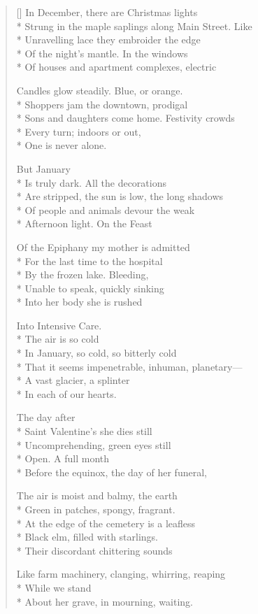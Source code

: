 \label{ch:christmaslight}
\settowidth{\versewidth}{Strung in the maple saplings along Main Street. Like}
\begin{verse}[\versewidth]
In December, there are Christmas lights\\*
Strung in the maple saplings along Main Street. Like\\*
Unravelling lace they embroider the edge\\*
Of the night's mantle. In the windows\\*
Of houses and apartment complexes, electric

Candles glow steadily. Blue, or orange.\\*
Shoppers jam the downtown, prodigal \\*
Sons and daughters come home. Festivity crowds\\*
Every turn; indoors or out,\\*
One is never alone.

\hspace*{4\vgap} But January \\*
Is truly dark. All the decorations\\*
Are stripped, the sun is low, the long shadows\\*
Of people and animals devour the weak\\*
Afternoon light. On the Feast

Of the Epiphany my mother is admitted\\*
For the last time to the hospital\\*
By the frozen lake. Bleeding,\\*
Unable to speak, quickly sinking\\*
Into her body she is rushed

Into Intensive Care.\\*
\hspace*{4\vgap} The air is so cold\\*
In January, so cold, so bitterly cold\\*
That it seems impenetrable, inhuman, planetary---\\*
A vast glacier, a splinter\\*
In each of our hearts.

\hspace*{4\vgap} The day after\\*
Saint Valentine's she dies still\\*
Uncomprehending, green eyes still\\*
Open. A full month\\*
Before the equinox, the day of her funeral,

The air is moist and balmy, the earth\\*
Green in patches, spongy, fragrant.\\*
At the edge of the cemetery is a leafless\\*
Black elm, filled with starlings.\\*
Their discordant chittering sounds

Like farm machinery, clanging, whirring, reaping\\*
While we stand\\*
About her grave, in mourning, waiting.
\end{verse}
